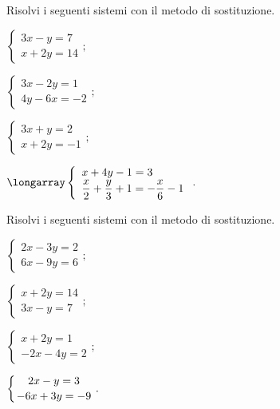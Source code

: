 \begin{esercizio}[\Ast]
 \label{ese:19.9}
Risolvi i seguenti sistemi con il metodo di sostituzione.
 \begin{multicols}{2}
 \begin{enumeratea}
  \item $\left\{\begin{array}{l}3x-y=7\\x+2y=14\end{array}\right.;$
\item $\left\{\begin{array}{l}3x-2y=1\\4y-6x=-2\end{array}\right.;$
\item $\left\{\begin{array}{l}3x+y=2\\x+2y=-1\end{array}\right.;$
\item ${\longarray\left\{\begin{array}{l}x+4y-1=3\\
	\dfrac{x}{2}+\dfrac{y}{3}+1=-{\dfrac{x}{6}}-1
	\end{array}\right..}$
 \end{enumeratea}
 \end{multicols}
\end{esercizio}

\begin{esercizio}[\Ast]
 \label{ese:19.10}
Risolvi i seguenti sistemi con il metodo di sostituzione.
 \begin{multicols}{2}
 \begin{enumeratea}
  \item $\left\{\begin{array}{l}2x-3y=2\\6x-9y=6\end{array}\right.;$
\item $\left\{\begin{array}{l}x+2y=14\\3x-y=7\end{array}\right.;$
\item $\left\{\begin{array}{l}x+2y=1\\-2x-4y=2\end{array}\right.;$
\item $\left\{\genfrac{}{}{0pt}{0}{2x-y=3}{-6x+3y=-9}\right..$
 \end{enumeratea}
 \end{multicols}
\end{esercizio}

